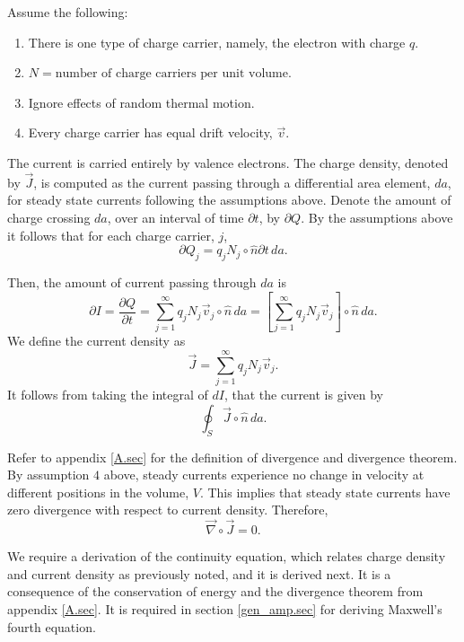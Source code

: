 \documentclass[12pt]{article}
\theoremstyle{definition}
\numberwithin{equation}{section}
\begin{document}
Assume the following:
\begin{enumerate}
\item There is one type of charge carrier, namely, the electron with charge $q$.
\item $N=\mbox{number of charge carriers per unit volume}.$
\item Ignore effects of random thermal motion.
\item Every charge carrier has equal drift velocity, $\vec{v}$.
\end{enumerate}

The current is carried entirely by valence electrons. The charge density, denoted by $\vec{J}$, is computed as the current passing through a differential area element, $da$, for steady state currents following the assumptions above. Denote the amount of charge crossing $da$, over an interval of time $\partial t$, by $\partial Q$. By the assumptions above it follows that for each charge carrier, $j$,
$$\partial Q_j=q_jN_j\circ\hat{n}\partial t\,da.$$

Then, the amount of current passing through $da$ is
$$\partial I=\frac{\partial Q}{\partial t}=\sum_{j=1}^\infty q_jN_j\vec{v}_j\circ\hat{n}\,da=\left[\sum_{j=1}^\infty q_jN_j\vec{v}_j\right]\circ\hat{n}\,da.$$ We define the current density as
\begin{equation}
\vec{J}=\sum_{j=1}^\infty q_jN_j\vec{v}_j.
\label{charge_den.eqn}
\end{equation}
It follows from taking the integral of $dI$, that the current is given by
\begin{equation}
\oint_S\vec{J}\circ\hat{n}\,da.
\label{current.eqn}
\end{equation}

Refer to appendix \ref{A.sec} for the definition of divergence and divergence theorem. By assumption $4$ above, steady currents experience no change in velocity at different positions in the volume, $V$. This implies that steady state currents have zero divergence with respect to current density. Therefore,
\begin{equation}
\vec{\nabla}\circ\vec{J}=0.
\label{steady_current1.eqn}
\end{equation}

We require a derivation of the continuity equation, which relates charge density and current density as previously noted, and it is derived next. It is a consequence of the conservation of energy and the divergence theorem from appendix \ref{A.sec}. It is required in section \ref{gen_amp.sec} for deriving Maxwell's fourth equation.
\end{document}
